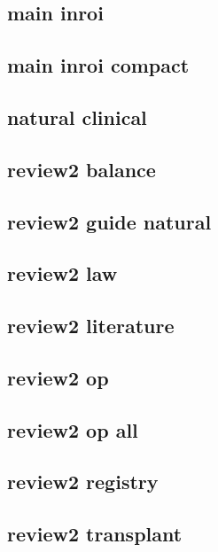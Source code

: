 \subsection*{main inroi}

\clearpage
\subsection*{main inroi compact}

\clearpage
\subsection*{natural clinical}

\clearpage
\subsection*{review2 balance}

\clearpage
\subsection*{review2 guide natural}

\clearpage
\subsection*{review2 law}

\clearpage
\subsection*{review2 literature}

\clearpage
\subsection*{review2 op}

\clearpage
\subsection*{review2 op all}

\clearpage
\subsection*{review2 registry}

\clearpage
\subsection*{review2 transplant}

\clearpage

